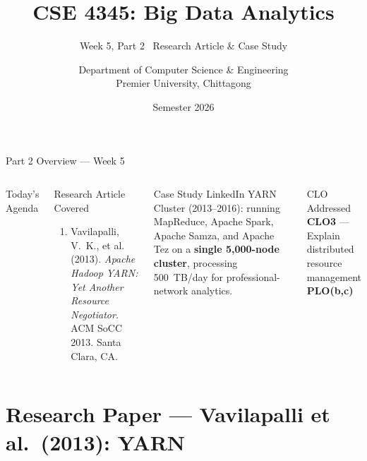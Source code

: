 \documentclass[aspectratio=169,10pt]{beamer}
\title[CSE 4345 \textbar{} Week 5, Part 2]{CSE 4345: Big Data Analytics}
\subtitle{Week 5, Part 2 \textemdash\ Research Article \& Case Study}
\author[Dept.\ of CSE]{Department of Computer Science \& Engineering\\[4pt]
       \small Premier University, Chittagong}
\institute{}
\date{Semester 2026}
\begin{document}

\begin{frame}
  \titlepage
\end{frame}

\begin{frame}{Part 2 Overview — Week 5}
  \begin{columns}[T]
      \begin{block}{Today's Agenda}
        \tableofcontents
      \end{block}

      \begin{exampleblock}{Research Article Covered}
        \begin{enumerate}
          \item Vavilapalli, V.~K., et al. (2013).
                \textit{Apache Hadoop YARN: Yet Another Resource
                Negotiator.} ACM SoCC 2013. Santa Clara, CA.
        \end{enumerate}
      \end{exampleblock}
      \vspace{6pt}
      \begin{alertblock}{Case Study}
        LinkedIn YARN Cluster (2013--2016): running MapReduce,
        Apache Spark, Apache Samza, and Apache Tez on a
        \textbf{single 5{,}000-node cluster}, processing
        500~TB/day for professional-network analytics.
      \end{alertblock}
      \vspace{4pt}
      \begin{block}{CLO Addressed}
        \textbf{CLO3} — Explain distributed resource management\\
        \textbf{PLO(b,c)}
      \end{block}
  \end{columns}
\end{frame}

\section{Research Paper — Vavilapalli et al.\ (2013): YARN}
\end{document}
